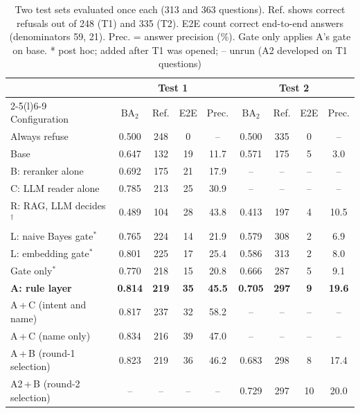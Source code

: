 \documentclass[runningheads]{llncs}
\newcommand{\BA}{\ensuremath{\mathrm{BA}_2}}
\begin{document}
\begin{table}[tb]
\caption{Two test sets evaluated once each  (313 and 363 questions). Ref. shows correct refusals out of 248 (T1) and 335 (T2). E2E count  correct end-to-end answers (denominators 59, 21). Prec. = answer precision (\%). Gate only applies A's gate on base. * post hoc; \textdagger{} added after T1 was opened; -- unrun (A2 developed on T1 questions)}\label{tab:main}
\centering\scriptsize\setlength{\tabcolsep}{3pt}%
\begin{tabular}{@{}lcccccccc@{}}
\toprule
 & \multicolumn{4}{c}{Test 1} & \multicolumn{4}{c}{Test 2} \\
\cmidrule(lr){2-5}\cmidrule(l){6-9}
Configuration & \BA & Ref. & E2E & Prec. & \BA & Ref. & E2E & Prec. \\
\midrule
Always refuse & 0.500 & 248 & 0 & -- & 0.500 & 335 & 0 & -- \\
Base & 0.647 & 132 & 19 & 11.7 & 0.571 & 175 & 5 & 3.0 \\
B: reranker alone & 0.692 & 175 & 21 & 17.9 & -- & -- & -- & -- \\
C: LLM reader alone & 0.785 & 213 & 25 & 30.9 & -- & -- & -- & -- \\
R: RAG, LLM decides$^\dagger$ & 0.489 & 104 & 28 & 43.8 & 0.413 & 197 & 4 & 10.5 \\
L: naive Bayes gate$^*$ & 0.765 & 224 & 14 & 21.9 & 0.579 & 308 & 2 & 6.9 \\
L: embedding gate$^*$ & 0.801 & 225 & 17 & 25.4 & 0.586 & 313 & 2 & 8.0 \\
Gate only$^*$ & 0.770 & 218 & 15 & 20.8 & 0.666 & 287 & 5 & 9.1 \\
\bfseries A: rule layer & \bfseries 0.814 & \bfseries 219 & \bfseries 35 & \bfseries 45.5 & \bfseries 0.705 & \bfseries 297 & \bfseries 9 & \bfseries 19.6 \\
A\,+\,C (intent and name) & 0.817 & 237 & 32 & 58.2 & -- & -- & -- & -- \\
A\,+\,C (name only) & 0.834 & 216 & 39 & 47.0 & -- & -- & -- & -- \\
A\,+\,B (round-1 selection) & 0.823 & 219 & 36 & 46.2 & 0.683 & 298 & 8 & 17.4 \\
A2\,+\,B (round-2 selection) & -- & -- & -- & -- & 0.729 & 297 & 10 & 20.0 \\
\bottomrule
\end{tabular}
\end{table}
\end{document}
